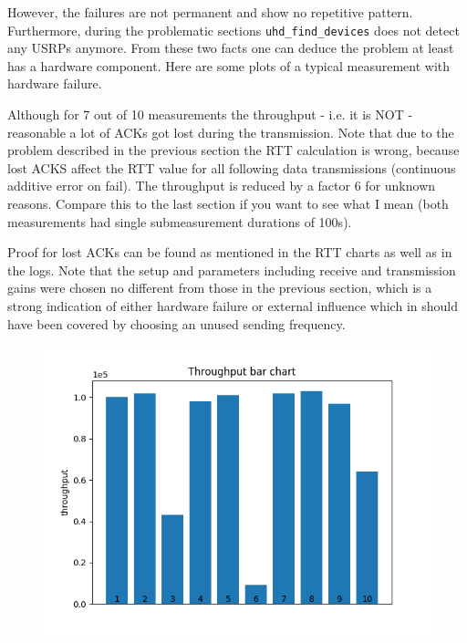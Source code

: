 \documentclass{article}
\begin{document}
However, the failures are not permanent and show no repetitive pattern. Furthermore, during the problematic sections \texttt{uhd\_find\_devices} does not detect any USRPs anymore. From these two facts one can deduce the problem at least has a hardware component. Here are some plots of a typical measurement with hardware failure. 

\bigskip

Although for 7 out of 10 measurements the throughput  - i.e. it is NOT - reasonable a lot of ACKs got lost during the transmission. Note that due to the problem described in the previous section the RTT calculation is wrong, because lost ACKS affect the RTT value for all following data transmissions (continuous additive error on fail). The throughput is reduced by a factor 6 for unknown reasons. Compare this to the last section if you want to see what I mean (both measurements had single submeasurement durations of 100s).

\bigskip

Proof for lost ACKs can be found as mentioned in the RTT charts as well as in the logs. Note that the setup and parameters including receive and transmission gains were chosen no different from those in the previous section, which is a strong indication of either hardware failure or external influence which in should have been covered by choosing an unused sending frequency. 

\begin{figure}[h] \label{usrp-fails2-1}
	\includegraphics[width=\textwidth]{usrp_fail2_tp_bar}
	
\end{figure}
\end{document}

